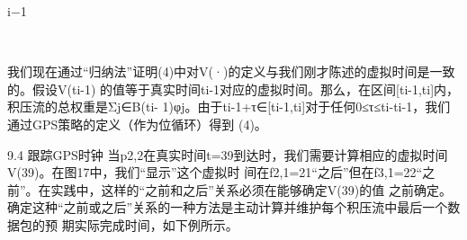                                i−1
                                         ​   ​

                                     ​




我们现在通过“归纳法”证明(4)中对V(·)的定义与我们刚才陈述的虚拟时间是一致的。假设V(ti-1)
的值等于真实时间ti-1对应的虚拟时间。那么，在区间[ti-1,ti]内，积压流的总权重是Σj∈B(ti-
1)φj。由于ti-1+τ∈[ti-1,ti]对于任何0≤τ≤ti-ti-1，我们通过GPS策略的定义（作为位循环）得到
(4)。

9.4 跟踪GPS时钟
当p2,2在真实时间t=39到达时，我们需要计算相应的虚拟时间V(39)。在图17中，我们“显示”这个虚拟时
间在f2,1=21“之后”但在f3,1=22“之前”。在实践中，这样的“之前和之后”关系必须在能够确定V(39)的值
之前确定。确定这种“之前或之后”关系的一种方法是主动计算并维护每个积压流中最后一个数据包的预
期实际完成时间，如下例所示。


